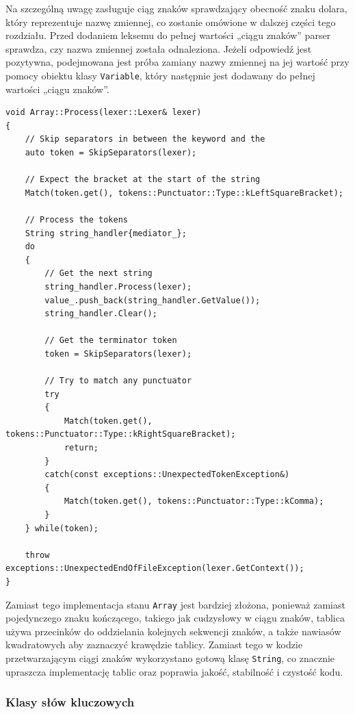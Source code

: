 Na szczególną uwagę zasługuje ciąg znaków sprawdzający obecność znaku dolara, który reprezentuje nazwę zmiennej, co zostanie omówione w dalszej części tego rozdziału. Przed dodaniem leksemu do pełnej wartości „ciągu znaków” parser sprawdza, czy nazwa zmiennej została odnaleziona. Jeżeli odpowiedź jest pozytywna, podejmowana jest próba zamiany nazwy zmiennej na jej wartość przy pomocy obiektu klasy \texttt{Variable}, który następnie jest dodawany do pełnej wartości „ciągu znaków”.


\begin{lstlisting}[label=list:array,caption=Metoda Array::Process(),basicstyle=\footnotesize\ttfamily]
void Array::Process(lexer::Lexer& lexer)
{
    // Skip separators in between the keyword and the
    auto token = SkipSeparators(lexer);

    // Expect the bracket at the start of the string
    Match(token.get(), tokens::Punctuator::Type::kLeftSquareBracket);

    // Process the tokens
    String string_handler{mediator_};
    do
    {
        // Get the next string
        string_handler.Process(lexer);
        value_.push_back(string_handler.GetValue());
        string_handler.Clear();

        // Get the terminator token
        token = SkipSeparators(lexer);

        // Try to match any punctuator
        try
        {
            Match(token.get(), tokens::Punctuator::Type::kRightSquareBracket);
            return;
        }
        catch(const exceptions::UnexpectedTokenException&)
        {
            Match(token.get(), tokens::Punctuator::Type::kComma);
        }
    } while(token);

    throw exceptions::UnexpectedEndOfFileException(lexer.GetContext());
}
\end{lstlisting}

Zamiast tego implementacja stanu \texttt{Array} jest bardziej złożona, ponieważ zamiast pojedynczego znaku kończącego, takiego jak cudzysłowy w ciągu znaków, tablica używa przecinków do oddzielania kolejnych sekwencji znaków, a także nawiasów kwadratowych aby zaznaczyć krawędzie tablicy. Zamiast tego w kodzie przetwarzającym ciągi znaków wykorzystano gotową klasę \texttt{String}, co znacznie upraszcza implementację tablic oraz poprawia jakość, stabilność i czystość kodu.

\subsubsection{Klasy słów kluczowych}

